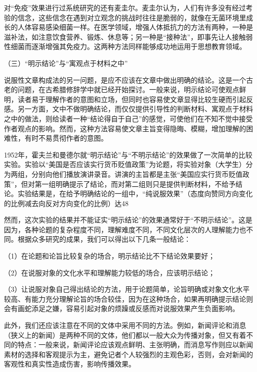 \documentclass[UTF8,12pt]{ctexart}
\numberwithin{equation}{section} %
\numberwithin{figure}{section}
\numberwithin{table}{section}
\begin{document}
	对“免疫”效果进行过系统研究的还有麦圭尔。麦圭尔认为，人们有许多没有经过考验的信念，这些信念在遇到对立观念的挑战时往往是脆弱的，就像在无菌环境里成长的人体容易感染细菌一样。在医学领域，增强人体抵抗力的方法有两种，一种是滋补法，如注意饮食营养、锻炼、休息等；另一种是“接种法”，即事先让人接触弱性细菌而逐渐增强其免疫力。这两种方法同样能够成功地运用于思想教育领域。
	
	（三）“明示结论”与“寓观点于材料之中”
	
	说服性文章构成法的另一问题，是应不应该在文章中做出明确的结论。这是一个古老的问题，在古希腊修辞学中就已经开始探讨。一般来说，明示结论可使观点鲜明，读者易于理解作者的意图和立场，但同时也容易使文章显得比较生硬而引起反感。另一方面，文中不做明确结论，而仅仅提供引导性的判断材料、寓观点于材料之中的做法，则给读者一种“结论得自于自己”的感觉，可使他们在不知不觉中接受作者观点的影响。然而，这种方法容易使文章主旨变得隐晦、模糊，增加理解的困难性，有时不易贯彻作者的意图。
	
	1952年，霍夫兰和曼德尔就“明示结论”与“不明示结论”的效果做了一次简单的比较实验。实验以“美国是否应该实行货币贬值政策”为论题，将实验对象（大学生）分为两组，分别向他们播放演讲录音。讲演的主旨都是主张“美国应实行货币贬值政策”，但对第一组明确提示了结论，而对第二组则只是提供判断材料，不给予结论。实验结果是，在给予明确结论的一组中，“纯说服效果”（态度向赞同方向变化的比例减去向反对方向变化的比例）达48%
	
	然而，这次实验的结果并不能证实“明示结论”的效果通常好于“不明示结论”。这是因为，各种论题的复杂程度不同，理解难度不同，不同文化层次的人理解能力也不同。根据众多研究的成果，我们可以得出以下几条一般结论：
	
	（1）在论题和论旨比较复杂的场合，明示结论比不下结论效果要好；
	
	（2）在说服对象的文化水平和理解能力较低的场合，应该明示结论；
	
	（3）让说服对象自己得出结论的方法，用于论题简单，论旨明确或对象文化水平较高、有能力充分理解论旨的场合较佳，因为在这种场合，如果再明确提示结论则会有画蛇添足之嫌，容易引起对象的烦躁或反感而对说服效果产生负面影响。
	
	此外，我们还应该注意在不同的文体中采用不同的方法。例如，新闻评论和消息（狭义上的新闻）是两种不同的文体，他们都以一般大众为传播对象，但又有着不同的特点：一般来说，新闻评论应该观点鲜明、主张明确，而消息写作则应以新闻素材的选择和客观提示为主，避免记者个人较强烈的主观色彩，否则，会对新闻的客观性和真实性造成伤害，影响传播效果。
	
\end{document}
